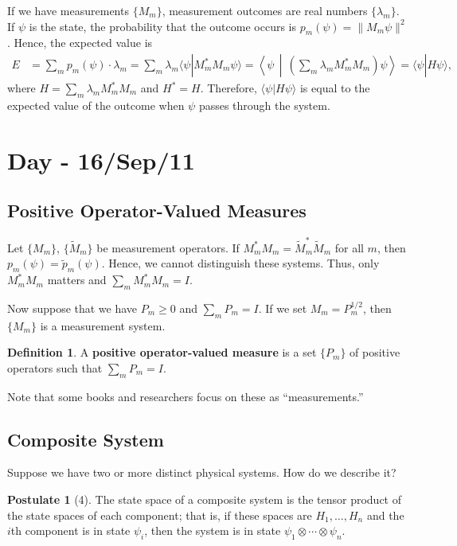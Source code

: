 \documentclass[12pt]{article}
\theoremstyle{definition}
\newtheorem*{definition}{Definition}
\newtheorem*{postulate}{Postulate}
\newcommand{\norm}[1]{\|#1\|}
\begin{document}
If we have measurements $\{M_m\}$, measurement outcomes are real numbers $\{\lambda_m\}$. If $\psi$ is the state, the probability that the outcome occurs is $p_m(\psi) = \norm{M_m\psi}^2$. Hence, the expected value is
\begin{align*}
E &= \sum_m p_m(\psi) \cdot \lambda_m = \sum_m \lambda_m \langle\psi|M_m^*M_m\psi\rangle = \left\langle\psi\,\middle|\,\left(\sum_m \lambda_m M_m^*M_m\right)\psi\right\rangle = \langle\psi|H\psi\rangle,
\end{align*}
where $H = \sum_m \lambda_m M_m^*M_m$ and $H^* = H$. Therefore, $\langle\psi|H\psi\rangle$ is equal to the expected value of the outcome when $\psi$ passes through the system.

\section{Day - 16/Sep/11}

\subsection{Positive Operator-Valued Measures}

Let $\{M_m\}$, $\{\tilde{M}_m\}$ be measurement operators. If $M_m^*M_m = \tilde{M}_m^*\tilde{M}_m$ for all $m$, then $p_m(\psi) = \tilde{p}_m(\psi)$. Hence, we cannot distinguish these systems. Thus, only $M_m^*M_m$ matters and $\sum_m M_m^*M_m = I$.

Now suppose that we have $P_m \geq 0$ and $\sum_m P_m = I$. If we set $M_m = P_m^{1/2}$, then $\{M_m\}$ is a measurement system.

\begin{definition}
A \textbf{positive operator-valued measure} is a set $\{P_m\}$ of positive operators such that $\sum_m P_m = I$.
\end{definition}

Note that some books and researchers focus on these as ``measurements.''

\subsection{Composite System}

Suppose we have two or more distinct physical systems. How do we describe it?

\begin{postulate}[4]
The state space of a composite system is the tensor product of the state spaces of each component; that is, if these spaces are $H_1,\ldots,H_n$ and the $i$th component is in state $\psi_i$, then the system is in state $\psi_1 \otimes \cdots \otimes \psi_n$.
\end{postulate}
\end{document}
